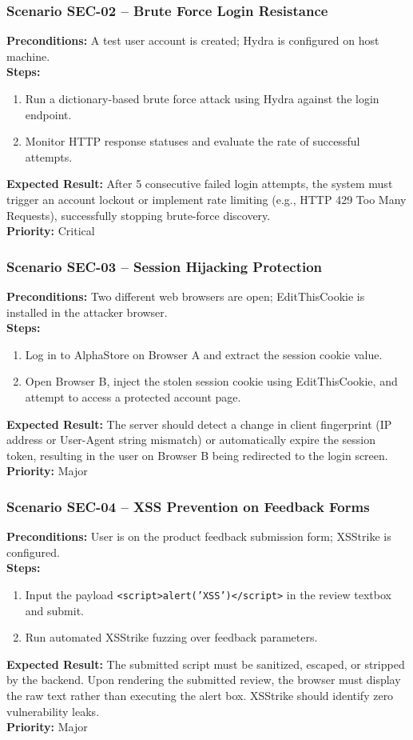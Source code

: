 \documentclass[12pt,a4paper]{article}
\begin{document}
\subsubsection*{Scenario SEC-02 – Brute Force Login Resistance}
\textbf{Preconditions:} A test user account is created; Hydra is configured on host machine.\\
\textbf{Steps:}
\begin{enumerate}
\item Run a dictionary-based brute force attack using Hydra against the login endpoint.
\item Monitor HTTP response statuses and evaluate the rate of successful attempts.
\end{enumerate}
\textbf{Expected Result:} After 5 consecutive failed login attempts, the system must trigger an account lockout or implement rate limiting (e.g., HTTP 429 Too Many Requests), successfully stopping brute-force discovery.\\
\textbf{Priority:} Critical

\subsubsection*{Scenario SEC-03 – Session Hijacking Protection}
\textbf{Preconditions:} Two different web browsers are open; EditThisCookie is installed in the attacker browser.\\
\textbf{Steps:}
\begin{enumerate}
\item Log in to AlphaStore on Browser A and extract the session cookie value.
\item Open Browser B, inject the stolen session cookie using EditThisCookie, and attempt to access a protected account page.
\end{enumerate}
\textbf{Expected Result:} The server should detect a change in client fingerprint (IP address or User-Agent string mismatch) or automatically expire the session token, resulting in the user on Browser B being redirected to the login screen.\\
\textbf{Priority:} Major

\subsubsection*{Scenario SEC-04 – XSS Prevention on Feedback Forms}
\textbf{Preconditions:} User is on the product feedback submission form; XSStrike is configured.\\
\textbf{Steps:}
\begin{enumerate}
\item Input the payload \texttt{<script>alert('XSS')</script>} in the review textbox and submit.
\item Run automated XSStrike fuzzing over feedback parameters.
\end{enumerate}
\textbf{Expected Result:} The submitted script must be sanitized, escaped, or stripped by the backend. Upon rendering the submitted review, the browser must display the raw text rather than executing the alert box. XSStrike should identify zero vulnerability leaks.\\
\textbf{Priority:} Major
\end{document}
